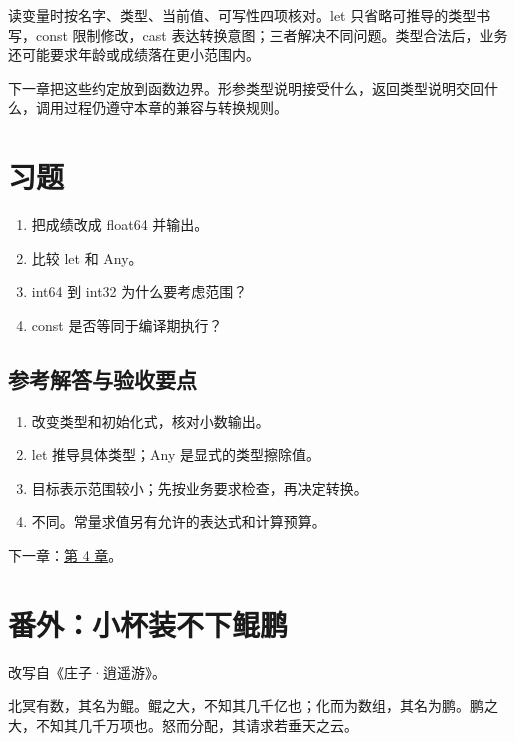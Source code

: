读变量时按名字、类型、当前值、可写性四项核对。let 只省略可推导的类型书写，const 限制修改，cast 表达转换意图；三者解决不同问题。类型合法后，业务还可能要求年龄或成绩落在更小范围内。

下一章把这些约定放到函数边界。形参类型说明接受什么，返回类型说明交回什么，调用过程仍遵守本章的兼容与转换规则。

\section{习题}

\begin{enumerate}

\item 把成绩改成 float64 并输出。

\item 比较 let 和 Any。

\item int64 到 int32 为什么要考虑范围？

\item const 是否等同于编译期执行？

\end{enumerate}

\subsection*{参考解答与验收要点}

\begin{enumerate}

\item 改变类型和初始化式，核对小数输出。

\item let 推导具体类型；Any 是显式的类型擦除值。

\item 目标表示范围较小；先按业务要求检查，再决定转换。

\item 不同。常量求值另有允许的表达式和计算预算。

\end{enumerate}

下一章：\hyperref[ch:04]{第 4 章}。

\section{番外：小杯装不下鲲鹏}

改写自《庄子·逍遥游》。

北冥有数，其名为鲲。鲲之大，不知其几千亿也；化而为数组，其名为鹏。鹏之大，不知其几千万项也。怒而分配，其请求若垂天之云。

